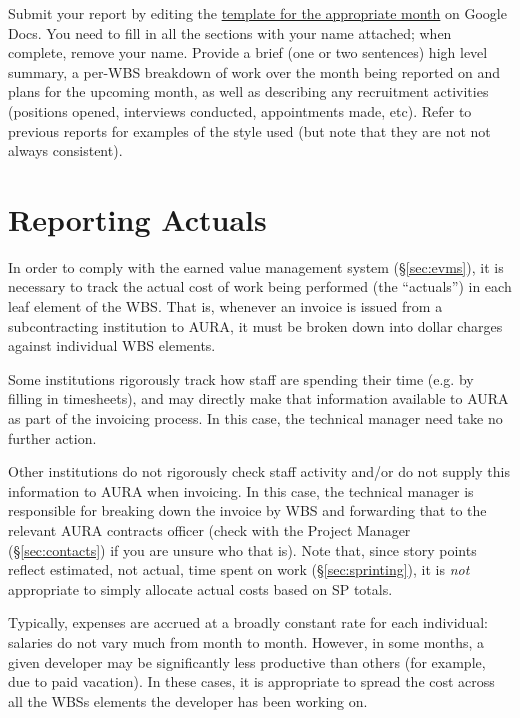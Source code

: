 Submit your report by editing the
\href{https://drive.google.com/drive/u/0/folders/0BxgFbTQURmr6TUJleXZaY2ZNcEE}{template
for the appropriate month} on Google Docs. You need to fill in all the
sections with your name attached; when complete, remove your name.
Provide a brief (one or two sentences) high level summary, a per-WBS
breakdown of work over the month being reported on and plans for the
upcoming month, as well as describing any recruitment activities
(positions opened, interviews conducted, appointments made, etc). Refer
to previous reports for examples of the style used (but note that they
are not not always consistent).

\section{Reporting Actuals}
\label{sec:actuals}

In order to comply with the
earned value management system (\S\ref{sec:evms}), it is
necessary to track the actual cost of work being performed (the
``actuals'') in each leaf element of the WBS. That is, whenever an
invoice is issued from a subcontracting institution to AURA, it must be
broken down into dollar charges against individual WBS elements.

Some institutions rigorously track how staff are spending their time
(e.g. by filling in timesheets), and may directly make that information
available to AURA as part of the invoicing process. In this case, the
technical manager need take no further action.

Other institutions do not rigorously check staff activity and/or do not
supply this information to AURA when invoicing. In this case, the
technical manager is responsible for breaking down the invoice by WBS
and forwarding that to the relevant AURA contracts officer (check with
the Project Manager
(\S\ref{sec:contacts}) if you are unsure who that is).
Note that, since
story points reflect estimated, not actual, time spent on work
(\S\ref{sec:sprinting}), it is \emph{not} appropriate to
simply allocate actual costs based on SP totals.

Typically, expenses are accrued at a broadly constant rate for each
individual: salaries do not vary much from month to month. However, in
some months, a given developer may be significantly less productive than
others (for example, due to paid vacation). In these cases, it is
appropriate to spread the cost across all the WBSs elements the
developer has been working on.

